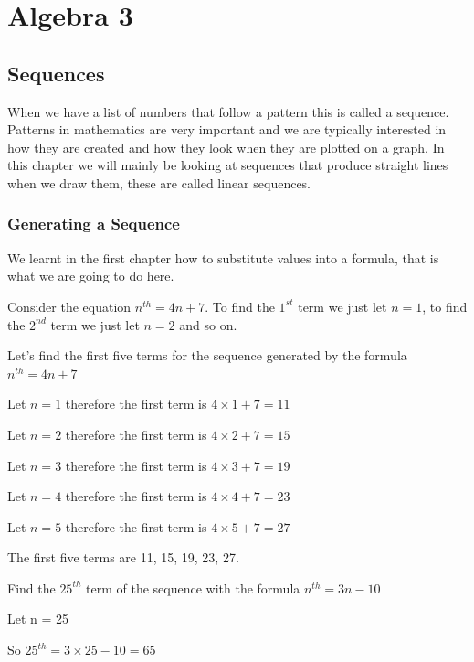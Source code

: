 \chapter{Algebra 3}
\section{Sequences}
When we have a list of numbers that follow a pattern this is called a sequence.  Patterns in mathematics are very important and we are typically interested in how they are created and how they look when they are plotted on a graph.  In this chapter we will mainly be looking at sequences that produce straight lines when we draw them, these are called linear sequences.
\subsection{Generating a Sequence}
We learnt in the first chapter how to substitute values into a formula, that is what we are going to do here.

Consider the equation $n^{th}=4n+7$.  To find the $1^{st}$ term we just let $n=1$, to find the $2^{nd}$ term we just let $n=2$ and so on.

\bigskip

\begin{exmp}
Let's find the first five terms for the sequence generated by the formula $n^{th}=4n+7$

\bigskip

Let $n=1$ therefore the first term is $4 \times 1 + 7 = 11$

\bigskip

Let $n=2$ therefore the first term is $4 \times 2 + 7 = 15$

\bigskip

Let $n=3$ therefore the first term is $4 \times 3 + 7 = 19$

\bigskip

Let $n=4$ therefore the first term is $4 \times 4 + 7 = 23$

\bigskip

Let $n=5$ therefore the first term is $4 \times 5 + 7 = 27$

\bigskip

The first five terms are 11, 15, 19, 23, 27.

\end{exmp}

\begin{exmp}
Find the $25^{th}$ term of the sequence with the formula $n^{th} = 3n-10$

\bigskip

Let n = 25

\bigskip

So $25^{th} = 3 \times 25 - 10 = 65$
\end{exmp}

